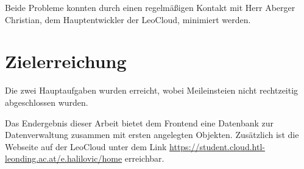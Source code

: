 Beide Probleme konnten durch einen regelmäßigen Kontakt mit Herr Aberger Christian, dem Hauptentwickler der LeoCloud, minimiert werden.

\section{Zielerreichung}

Die zwei Hauptaufgaben wurden erreicht, wobei Meileinsteien nicht rechtzeitig abgeschlossen wurden. 

Das Endergebnis dieser Arbeit bietet dem Frontend eine Datenbank zur Datenverwaltung zusammen mit ersten angelegten Objekten. 
Zusätzlich ist die Webseite auf der LeoCloud unter dem Link \href{https://student.cloud.htl-leonding.ac.at/e.halilovic/home}{https://student.cloud.htl-leonding.ac.at/e.halilovic/home} erreichbar.